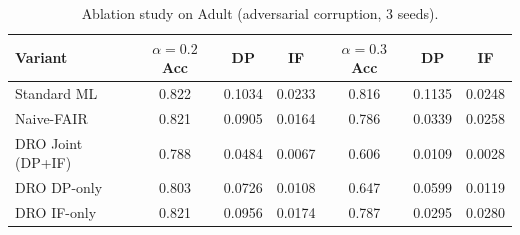 \begin{table}[htbp]
\centering\small
\caption{Ablation study on Adult (adversarial corruption, 3 seeds).}
\label{tab:ablation}
\begin{tabular}{L{4cm}cccccc}
\toprule
{}
\color{white}\textbf{Variant} & \color{white}\(\alpha{=}0.2\) Acc & \color{white}DP & \color{white}IF & \color{white}\(\alpha{=}0.3\) Acc & \color{white}DP & \color{white}IF \\
\midrule
Standard ML & 0.822 & 0.1034 & 0.0233 & 0.816 & 0.1135 & 0.0248 \\
Naive-FAIR & 0.821 & 0.0905 & 0.0164 & 0.786 & 0.0339 & 0.0258 \\
DRO Joint (DP+IF) & 0.788 & 0.0484 & 0.0067 & 0.606 & 0.0109 & 0.0028 \\
DRO DP-only & 0.803 & 0.0726 & 0.0108 & 0.647 & 0.0599 & 0.0119 \\
DRO IF-only & 0.821 & 0.0956 & 0.0174 & 0.787 & 0.0295 & 0.0280 \\
\bottomrule
\end{tabular}
\end{table}